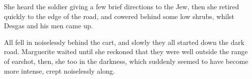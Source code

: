 She heard the soldier giving a few brief directions to the Jew, then she retired quickly to the edge of the road, and cowered behind some low shrubs, whilst Desgas and his men came up.

All fell in noiselessly behind the cart, and slowly they all started down the dark road. Marguerite waited until she reckoned that they were well outside the range of earshot, then, she too in the darkness, which suddenly seemed to have become more intense, crept noiselessly along.